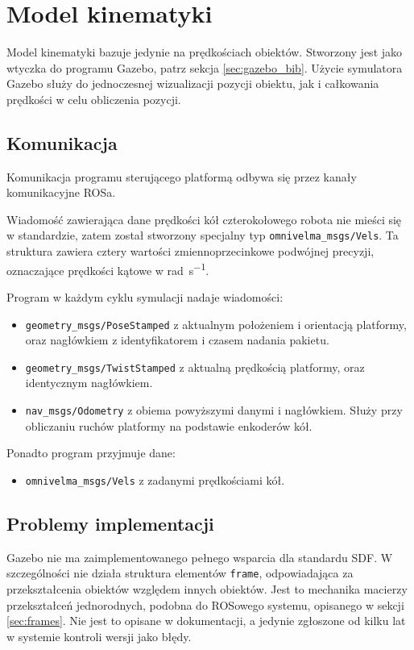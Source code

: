 \section{Model kinematyki}
	Model kinematyki bazuje jedynie na prędkościach obiektów.
	Stworzony jest jako wtyczka do programu Gazebo, patrz sekcja \ref{sec:gazebo_bib}.
	Użycie symulatora Gazebo służy do jednoczesnej wizualizacji pozycji obiektu, jak i całkowania prędkości w celu obliczenia pozycji.
	
	\subsection{Komunikacja}
		Komunikacja programu sterującego platformą odbywa się przez kanały komunikacyjne ROSa.

		Wiadomość zawierająca dane prędkości kół czterokołowego robota nie mieści się w standardzie, zatem został stworzony specjalny typ \texttt{omnivelma\_msgs/Vels}.
		Ta struktura zawiera cztery wartości zmiennoprzecinkowe podwójnej precyzji, oznaczające prędkości kątowe w \si{\radian\per\second}.

		Program w każdym cyklu symulacji nadaje wiadomości:
		\begin{itemize}
		\item \texttt{geometry\_msgs/PoseStamped} z aktualnym położeniem i orientacją platformy, oraz nagłówkiem z identyfikatorem i czasem nadania pakietu.
		\item \texttt{geometry\_msgs/TwistStamped} z aktualną prędkością platformy, oraz identycznym nagłówkiem.
		\item \texttt{nav\_msgs/Odometry} z obiema powyższymi danymi i nagłówkiem. Służy przy obliczaniu ruchów platformy na podstawie enkoderów kół.
		\end{itemize}
		Ponadto program przyjmuje dane:
		\begin{itemize}
		\item \texttt{omnivelma\_msgs/Vels} z zadanymi prędkościami kół.
		\end{itemize}
	
	\subsection{Problemy implementacji}
		Gazebo nie ma zaimplementowanego pełnego wsparcia dla standardu SDF.
		W szczególności nie działa struktura elementów \texttt{frame}, odpowiadająca za przekształcenia obiektów względem innych obiektów.
		Jest to mechanika macierzy przekształceń jednorodnych, podobna do ROSowego systemu, opisanego w sekcji \ref{sec:frames}.
		Nie jest to opisane w dokumentacji, a jedynie zgłoszone od kilku lat w systemie kontroli wersji jako błędy.

